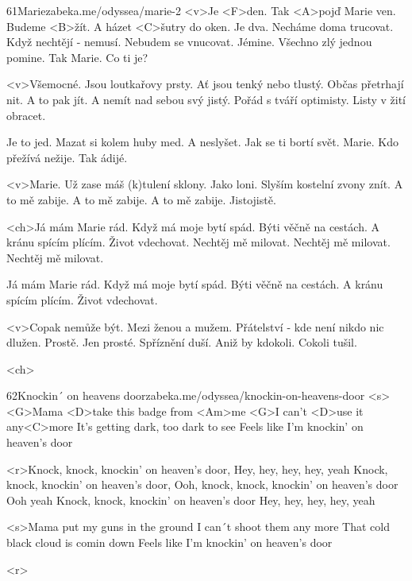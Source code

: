 \begin{song}{61}{Marie}{zabeka.me/odyssea/marie-2}
	<v>Je <F>den. Tak <A>pojď Marie ven.
	Budeme <B>žít. A házet <C>šutry do oken.
	Je dva. Necháme doma trucovat.
	Když nechtějí - nemusí. Nebudem se vnucovat.
	Jémine. Všechno zlý jednou pomine.
	Tak Marie. Co ti je?

	<v>Všemocné. Jsou loutkařovy prsty.
	Ať jsou tenký nebo tlustý. Občas přetrhají nit.
	A to pak jít. A nemít nad sebou svý jistý.
	Pořád s tváří optimisty. Listy v žití obracet.

	Je to jed. Mazat si kolem huby med.
	A neslyšet. Jak se ti bortí svět.
	Marie. Kdo přežívá nežije. Tak ádijé.

	<v>Marie. Už zase máš (k)tulení sklony.
	Jako loni. Slyším kostelní zvony znít.
	A to mě zabije. A to mě zabije.
	A to mě zabije. Jistojistě.

	<ch>Já mám Marie rád. Když má moje bytí spád.
	Býti věčně na cestách. A kránu spícím plícím.
	Život vdechovat. Nechtěj mě milovat.
	Nechtěj mě milovat. Nechtěj mě milovat.

	Já mám Marie rád. Když má moje bytí spád.
	Býti věčně na cestách. A kránu spícím plícím.
	Život vdechovat.

	<v>Copak nemůže být. Mezi ženou a mužem.
	Přátelství - kde není nikdo nic dlužen. Prostě.
	Jen prosté. Spříznění duší.
	Aniž by kdokoli. Cokoli tušil.

	<ch>

\end{song}
\begin{song}{62}{Knockin´ on heavens door}{zabeka.me/odyssea/knockin-on-heavens-door}
	<s><G>Mama <D>take this badge from <Am>me
	<G>I can't <D>use it any<C>more
	It's getting dark, too dark to see
	Feels like I'm knockin' on heaven's door

	<r>Knock, knock, knockin' on heaven's door,
	Hey, hey, hey, hey, yeah
	Knock, knock, knockin' on heaven's door,
	Ooh, knock, knock, knockin' on heaven's door
	Ooh yeah
	Knock, knock, knockin' on heaven's door
	Hey, hey, hey, hey, yeah

	<s>Mama put my guns in the ground
	I can´t shoot them any more
	That cold black cloud is comin down
	Feels like I'm knockin' on heaven's door

	<r>
\end{song}

